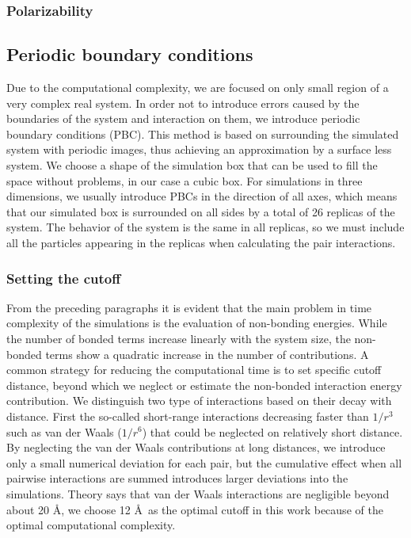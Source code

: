 \subsubsection{Polarizability}



\subsection{Periodic boundary conditions}
Due to the computational complexity, we are focused on only small region of a very complex real system.  In order not to introduce errors caused by the boundaries of the system and interaction on them, we introduce periodic boundary conditions (PBC). This method is based on surrounding the simulated system with periodic images, thus achieving an approximation by a surface less system. We choose a shape of the simulation box that can be used to fill the space without problems, in our case a cubic box. For simulations in three dimensions, we usually introduce PBCs in the direction of all axes, which means that our simulated box is surrounded on all sides by a total of 26 replicas of the system. The behavior of the system is the same in all replicas, so we must include all the particles appearing in the replicas when calculating the pair interactions. 

\subsubsection{Setting the cutoff}
From the preceding paragraphs it is evident that the main problem in time complexity of the simulations is the evaluation of non-bonding energies. While the number of bonded terms increase linearly with the system size, the non-bonded terms show a quadratic increase in the number of contributions. A common strategy for reducing the computational time is to set specific cutoff distance, beyond which we neglect or estimate the non-bonded interaction energy contribution. We distinguish two type of interactions based on their decay with distance. First the so-called short-range interactions decreasing faster than $1/r^3$ such as van der Waals ($1/r^6$) that could be neglected on relatively short distance. By neglecting the van der Waals contributions at long distances, we introduce only a small numerical deviation for each pair, but the cumulative effect when all pairwise interactions are summed introduces larger deviations into the simulations. Theory says that van der Waals interactions are negligible beyond about 20 \AA, we choose 12 \AA~as the optimal cutoff in this work because of the optimal computational complexity. 

